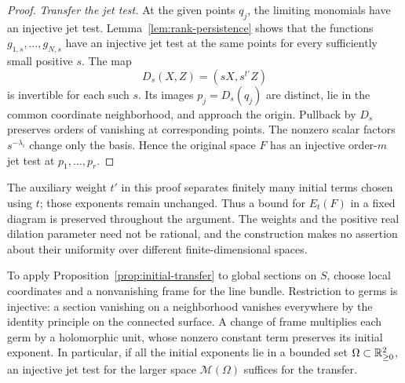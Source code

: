 \begin{proof}
\emph{Transfer the jet test.}
At the given points $q_j$, the limiting monomials have an injective jet
test.  Lemma~\ref{lem:rank-persistence} shows that the functions
$g_{1,s},\ldots,g_{N,s}$ have an injective jet test at the same points
for every sufficiently small positive $s$.  The map
\[
 D_s(X,Z)=(sX,s^{t'}Z)
\]
is invertible for each such $s$.  Its images $p_j=D_s(q_j)$ are distinct,
lie in the common coordinate neighborhood, and approach the origin.
Pullback by $D_s$ preserves orders of vanishing at corresponding
points.  The nonzero scalar factors $s^{-\lambda_i}$ change only the
basis.  Hence the original space $F$ has an injective order-$m$ jet
test at $p_1,\ldots,p_r$.
\end{proof}

The auxiliary weight $t'$ in this proof separates finitely many initial
terms chosen using $t$; those exponents remain unchanged.  Thus a bound
for $E_t(F)$ in a fixed diagram is preserved throughout the argument.
The weights and the positive real dilation parameter need not be
rational, and the construction makes no assertion about their uniformity
over different finite-dimensional spaces.

To apply Proposition~\ref{prop:initial-transfer} to global sections on
$S$, choose local coordinates and a nonvanishing frame for the line
bundle.  Restriction to germs is injective: a section vanishing on a
neighborhood vanishes everywhere by the identity principle on the
connected surface.  A change of frame multiplies each germ by a
holomorphic unit, whose nonzero constant term preserves its initial
exponent.  In particular, if all the initial exponents lie in a bounded
set $\Omega\subset\mathbb R_{\ge0}^2$, an injective jet test for the larger
space $\mathcal M(\Omega)$ suffices for the transfer.
